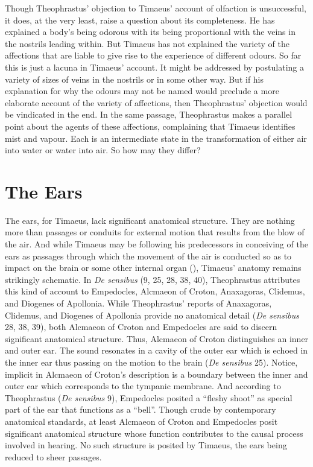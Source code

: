 Though Theophrastus' objection to Timaeus' account of olfaction is unsuccessful, it does, at the very least, raise a question  about its completeness. He has explained a body's being odorous with its being proportional with the veins in the nostrils leading within. But Timaeus has not explained the variety of the affections that are liable to give rise to the experience of different odours. So far this is just a lacuna in Timaeus' account. It might be addressed by postulating a variety of sizes of veins in the nostrils or in some other way. But if his explanation for why the odours may not be named would preclude a more elaborate account of the variety of affections, then Theophrastus' objection would be vindicated in the end. In the same passage, Theophrastus makes a parallel point about the agents of these affections, complaining that Timaeus identifies mist and vapour. Each is an intermediate state in the transformation of either air into water or water into air. So how may they differ?


\section{The Ears} %
\label{sec:the_ears}

The ears, for Timaeus, lack significant anatomical structure. They are nothing more than passages or conduits for external motion that results from the blow of the air. And while Timaeus may be following his predecessors in conceiving of the ears as passages through which the movement of the air is conducted so as to impact on the brain or some other internal organ (\citealt[94]{Beare:1906uq}), Timaeus' anatomy remains strikingly schematic. In \emph{De sensibus} (9, 25, 28, 38, 40), Theophrastus attributes this kind of account to Empedocles, Alcmaeon of Croton, Anaxagoras, Clidemus, and Diogenes of Apollonia. While Theophrastus' reports of Anaxagoras, Clidemus, and Diogenes of Apollonia provide no anatomical detail (\emph{De sensibus} 28, 38, 39), both Alcmaeon of Croton and Empedocles are said to discern significant anatomical structure. Thus, Alcmaeon of Croton distinguishes an inner and outer ear. The sound resonates in a cavity of the outer ear which is echoed in the inner ear thus passing on the motion to the brain (\emph{De sensibus} 25). Notice, implicit in Alcmaeon of Croton's description is a boundary between the inner and outer ear which corresponds to the tympanic membrane. And according to Theophrastus (\emph{De sensibus} 9), Empedocles posited a ``fleshy shoot'' as special part of the ear that functions as a ``bell''. Though crude by contemporary anatomical standards, at least Alcmaeon of Croton and Empedocles posit significant anatomical structure whose function contributes to the causal process involved in hearing. No such structure is posited by Timaeus, the ears being reduced to sheer passages.


